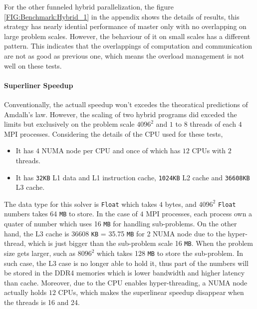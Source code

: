 For the other funneled hybrid parallelization, the figure 
            \ref{FIG:Benchmark:Hybrid_1} 
in the appendix shows the details of results,
this strategy has nearly idential performance of master only with no overlapping on large problem scales.
However, the behaviour of it on small scales has a different pattern.
This indicates that the overlappings of computation and communication are not as good as previous one, which means the overload management is not 
well on these tests.


\paragraph{Superliner Speedup}
Conventionally, the actuall speedup won't excedes the theoratical predictions of Amdalh's law.
However, the scaling of two hybrid programs did exceded the limits but exclusively on the problem scale $4096^2$ and $1$ to $8$ threads of each $4$ MPI processes.
Considering the details of the CPU used for these tests, 
\begin{itemize}
  \item It has $4$ NUMA node per CPU and once of which has $12$ CPUs with $2$ threads.
  \item It has \texttt{32KB} L1 data and L1 instruction cache, \texttt{1024KB} L2 cache and \texttt{36608KB} L3 cache.
\end{itemize}
The data type for this solver is \texttt{Float} which takes $4$ bytes, and $4096^2$ \texttt{Float} numbers takes 64 \texttt{MB} to store.
In the case of $4$ MPI processes, each process own a quater of number which uses 16 \texttt{MB} for handling sub-problems.
On the other hand, the L3 cache is 36608 \texttt{KB} = 35.75 \texttt{MB} for 2 NUMA node due to the hyper-thread,
which is just bigger than the sub-problem scale 16 \texttt{MB}.
When the problem size gets larger, such as $8096^2$ which takes 128 \texttt{MB} to store the sub-problem. 
In such case, the L3 case is no longer able to hold it, thus part of the numbers will be stored in the DDR4 memories which is lower bandwidth and higher latency than cache.
Moreover, due to the CPU enables hyper-threading, a NUMA node actually holds $12$ CPUs, which makes the 
superlinear speedup disappear when the threads is 16 and 24.


